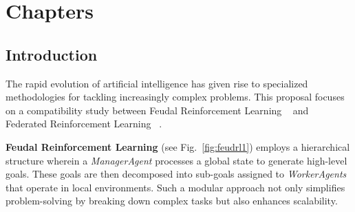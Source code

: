 \documentclass[12pt,a4paper,twoside,openany]{book}
\begin{document}
\let\cleardoublepage\clearpage

\setcounter{section}{0}
\renewcommand{\thesection}{\arabic{section}}

\frontmatter


\newpage

\newpage

\pagestyle{fancy}
\renewcommand{\chaptermark}[1]{ \markboth{#1}{}}
\renewcommand{\sectionmark}[1]{\markright{ \thesection.\ #1}}
\lhead[\fancyplain{}{\bfseries\thepage}]{\fancyplain{}{\bfseries\rightmark}}
\rhead[\fancyplain{}{\bfseries\leftmark}]{\fancyplain{}{\bfseries\thepage}}
\cfoot{}

\clearpage
{}
{}
\tableofcontents
\clearpage
{}
{}
\listoffigures
\clearpage
{}
{}
\listoftables

\mainmatter

\part*{Chapters}

\thispagestyle{empty}


\pagestyle{fancy}
\renewcommand{\chaptermark}[1]{ \markboth{#1}{}}
\renewcommand{\sectionmark}[1]{\markright{ \thesection.\ #1}}
\lhead[\fancyplain{}{\bfseries\thepage}]{\fancyplain{}{\bfseries\rightmark}}
\rhead[\fancyplain{}{\bfseries\leftmark}]{\fancyplain{}{\bfseries\thepage}}
\cfoot{}

\onehalfspacing


\chapter{Introduction}

The rapid evolution of artificial intelligence has given rise to specialized methodologies for tackling increasingly complex problems. This proposal focuses on a compatibility study between Feudal Reinforcement Learning ~\cite{Vezhnevets2017} and Federated Reinforcement Learning ~\cite{McMahan2016}.

\textbf{Feudal Reinforcement Learning} (see Fig.~\ref{fig:feudrl1}) employs a hierarchical structure wherein a \emph{ManagerAgent} processes a global state to generate high-level goals. These goals are then decomposed into sub-goals assigned to \emph{WorkerAgents} that operate in local environments. Such a modular approach not only simplifies problem-solving by breaking down complex tasks but also enhances scalability.
\end{document}
